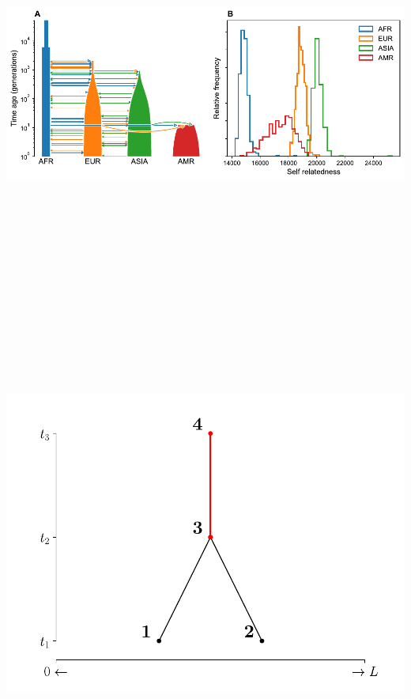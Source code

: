 \documentclass[
  letterpaper,
  DIV=11,
  numbers=noendperiod]{scrartcl}
\begin{document}
\begin{center}
\includegraphics[width=\linewidth,height=5.72917in,keepaspectratio]{slides_files/mediabag/imgs/geneticvariance.pdf}
\end{center}

\includegraphics[width=\linewidth,height=5.72917in,keepaspectratio]{slides_files/mediabag/imgs/covariance-1.pdf}
\end{document}

